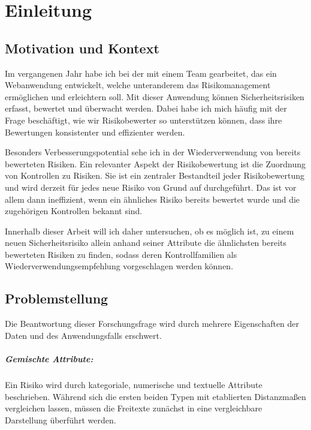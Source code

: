 \chapter{Einleitung}\label{cha:einleitung}

\section{Motivation und Kontext}\label{sec:motivation}
Im vergangenen Jahr habe ich bei der \hsmafirma{} mit einem Team gearbeitet, das ein Webanwendung entwickelt, welche unteranderem das Risikomanagement ermöglichen und erleichtern soll.
Mit dieser Anwendung können Sicherheitsrisiken erfasst, bewertet und überwacht werden.
Dabei habe ich mich häufig mit der Frage beschäftigt, wie wir Risikobewerter so unterstützen können, dass ihre Bewertungen konsistenter und effizienter werden.

Besonders Verbesserungspotential sehe ich in der Wiederverwendung von bereits bewerteten Risiken.
Ein relevanter Aspekt der Risikobewertung ist die Zuordnung von Kontrollen zu Risiken.
Sie ist ein zentraler Bestandteil jeder Risikobewertung und wird derzeit für jedes neue Risiko von Grund auf durchgeführt.
Das ist vor allem dann ineffizient, wenn ein ähnliches Risiko bereits bewertet wurde und die zugehörigen Kontrollen bekannt sind.

Innerhalb dieser Arbeit will ich daher untersuchen, ob es möglich ist, zu einem neuen Sicherheitsrisiko allein anhand seiner Attribute die ähnlichsten bereits bewerteten Risiken zu finden, sodass deren Kontrollfamilien als Wiederverwendungsempfehlung vorgeschlagen werden können.

\section{Problemstellung}\label{sec:problem}
Die Beantwortung dieser Forschungsfrage wird durch mehrere Eigenschaften der Daten und des Anwendungsfalls erschwert.

\paragraph{Gemischte Attribute:}
Ein Risiko wird durch kategoriale, numerische und textuelle Attribute beschrieben.
Während sich die ersten beiden Typen mit etablierten Distanzmaßen vergleichen lassen, müssen die Freitexte zunächst in eine vergleichbare Darstellung überführt werden.

